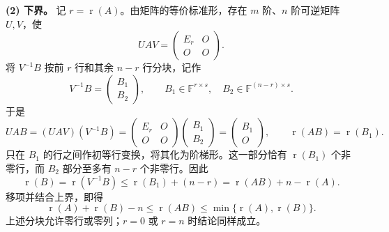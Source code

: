 \documentclass[11pt,a4paper,fontset=fandol]{ctexart}
\newcommand{\rk}{\operatorname{r}}
\newcommand{\ans}[1]{\boxed{#1}}
\begin{document}
\textbf{(2) 下界。}
记 $r=\rk(A)$。由矩阵的等价标准形，存在 $m$ 阶、$n$ 阶可逆矩阵 $U,V$，使
\[
UAV=\begin{pmatrix}E_r&O\\O&O\end{pmatrix}.
\]
将 $V^{-1}B$ 按前 $r$ 行和其余 $n-r$ 行分块，记作
\[
V^{-1}B=\begin{pmatrix}B_1\\B_2\end{pmatrix},
\qquad B_1\in\mathbb{F}^{r\times s},\quad
B_2\in\mathbb{F}^{(n-r)\times s}.
\]
于是
\[
UAB=(UAV)(V^{-1}B)
=\begin{pmatrix}E_r&O\\O&O\end{pmatrix}
\begin{pmatrix}B_1\\B_2\end{pmatrix}
=\begin{pmatrix}B_1\\O\end{pmatrix},
\qquad \rk(AB)=\rk(B_1).
\]
只在 $B_1$ 的行之间作初等行变换，将其化为阶梯形。这一部分恰有
$\rk(B_1)$ 个非零行，而 $B_2$ 部分至多有 $n-r$ 个非零行。因此
\[
\rk(B)=\rk(V^{-1}B)
\le\rk(B_1)+(n-r)
=\rk(AB)+n-\rk(A).
\]
移项并结合上界，即得
\[
\ans{\rk(A)+\rk(B)-n\le\rk(AB)
\le\min\{\rk(A),\rk(B)\}}.
\]
上述分块允许零行或零列；$r=0$ 或 $r=n$ 时结论同样成立。
\end{document}
